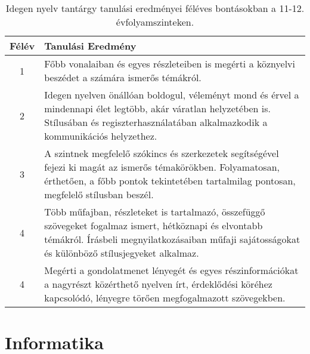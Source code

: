        
           \begin{longtable}{c | p{} }
            \caption[Idegen nyelv 11-12.]{Idegen nyelv tantárgy tanulási eredményei féléves bontásokban a 11-12. évfolyamszinteken. }  \\

            \textbf{Félév} & \textbf{Tanulási Eredmény} \\
            \hline
            \endhead
                                
                                          1 &  Főbb vonalaiban és egyes részleteiben is megérti a köznyelvi beszédet a számára ismerős témákról. \\ \hline
                                          2 &  Idegen nyelven önállóan boldogul, véleményt mond és érvel a mindennapi élet legtöbb, akár váratlan helyzetében is. Stílusában és regiszterhasználatában alkalmazkodik a kommunikációs helyzethez. \\ \hline
                                          3 &  A szintnek megfelelő szókincs és szerkezetek segítségével fejezi ki magát az ismerős témakörökben. Folyamatosan, érthetően, a főbb pontok tekintetében tartalmilag pontosan, megfelelő stílusban beszél. \\ \hline
                                          4 &  Több műfajban, részleteket is tartalmazó, összefüggő szövegeket fogalmaz ismert, hétköznapi és elvontabb témákról. Írásbeli megnyilatkozásaiban műfaji sajátosságokat és különböző stílusjegyeket alkalmaz. \\ \hline
                                          4 &  Megérti a gondolatmenet lényegét és egyes részinformációkat a nagyrészt közérthető nyelven írt, érdeklődési köréhez kapcsolódó, lényegre törően megfogalmazott szövegekben. \\ \hline
                                      
                        \end{longtable}
            \clearpage

        \section{Informatika}

